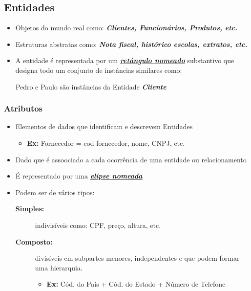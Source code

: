 \documentclass[12pt,a4paper]{article}
\begin{document}
\subsection{Entidades}
\begin{itemize}
    \item Objetos do mundo real como: \textit{\textbf{Clientes, Funcionários, Produtos, etc.}}
    \item Estruturas abstratas como: \textit{\textbf{Nota fiscal, histórico escolas, extratos, etc.}}
    \item A entidade é representada por um \textbf{\textit{\underline{retângulo nomeado}}} substantivo que designa todo um conjunto de instâncias similares como:\par Pedro e Paulo são instâncias da Entidade \textit{\textbf{Cliente}}
\end{itemize}

\subsubsection{Atributos}
\begin{itemize}
    \item Elementos de dados que identificam e descrevem Entidades
        \begin{itemize}
            \item \textbf{Ex:} Fornecedor = cod-fornecedor, nome, CNPJ, etc.
        \end{itemize}
    \item Dado que é assoociado a cada ocorrência de uma entidade ou relacionamento
    \item É representado por uma \textbf{\textit{\underline{elipse nomeada}}}
    \item Podem ser de vários tipos:
        \begin{description}
            \item[\textbf{Simples:}] indivisíveis como: CPF, preço, altura, etc.
            \item[\textbf{Composto:}] divisíveis em subpartes menores, independentes e que podem formar uma hierarquia.
                \begin{itemize}
                    \item \textbf{Ex:} Cód. do País + Cód. do Estado + Número de Telefone
                \end{itemize}
        \end{description}
\end{itemize}
\end{document}
